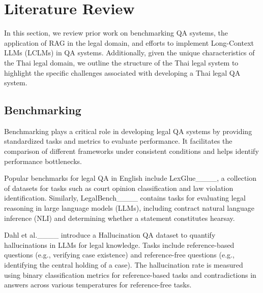 \section{Literature Review}
\label{sec:lit_review}

In this section, we review prior work on benchmarking QA systems, the application of RAG in the legal domain, and efforts to implement Long-Context LLMs (LCLMs) in QA systems. 
%
Additionally, given the unique characteristics of the Thai legal domain, we outline the structure of the Thai legal system to highlight the specific challenges associated with developing a Thai legal QA system.

\subsection{Benchmarking}
\label{subsec: benchmarking}

Benchmarking plays a critical role in developing legal QA systems by providing standardized tasks and metrics to evaluate performance. 
%
It facilitates the comparison of different frameworks under consistent conditions and helps identify performance bottlenecks.

Popular benchmarks for legal QA in English include LexGlue____, a collection of datasets for tasks such as court opinion classification and law violation identification. 
%
Similarly, LegalBench____ contains tasks for evaluating legal reasoning in large language models (LLMs), including contract natural language inference (NLI) and determining whether a statement constitutes hearsay.

Dahl et al.____ introduce a Hallucination QA dataset to quantify hallucinations in LLMs for legal knowledge. 
%
Tasks include reference-based questions (e.g., verifying case existence) and reference-free questions (e.g., identifying the central holding of a case). 
%
The hallucination rate is measured using binary classification metrics for reference-based tasks and contradictions in answers across various temperatures for reference-free tasks.

